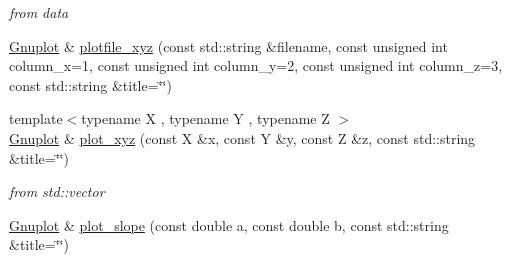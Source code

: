 \begin{DoxyCompactItemize}
\begin{DoxyCompactList}\small\item\em from data \end{DoxyCompactList}\item 
\hyperlink{classkukadu_1_1Gnuplot}{Gnuplot} \& \hyperlink{classkukadu_1_1Gnuplot_a03b4eec7a72bc05abfcdfd7bcd61513b}{plotfile\-\_\-xyz} (const std\-::string \&filename, const unsigned int column\-\_\-x=1, const unsigned int column\-\_\-y=2, const unsigned int column\-\_\-z=3, const std\-::string \&title=\char`\"{}\char`\"{})
\item 
\hypertarget{classkukadu_1_1Gnuplot_ac3e5d63b5a9729d5e609e45abc65520f}{{\footnotesize template$<$typename X , typename Y , typename Z $>$ }\\\hyperlink{classkukadu_1_1Gnuplot}{Gnuplot} \& \hyperlink{classkukadu_1_1Gnuplot_ac3e5d63b5a9729d5e609e45abc65520f}{plot\-\_\-xyz} (const X \&x, const Y \&y, const Z \&z, const std\-::string \&title=\char`\"{}\char`\"{})}\label{classkukadu_1_1Gnuplot_ac3e5d63b5a9729d5e609e45abc65520f}

\begin{DoxyCompactList}\small\item\em from std\-::vector \end{DoxyCompactList}\item 
\hypertarget{classkukadu_1_1Gnuplot_aaddc220bf3a1726a962c801a1218b826}{\hyperlink{classkukadu_1_1Gnuplot}{Gnuplot} \& \hyperlink{classkukadu_1_1Gnuplot_aaddc220bf3a1726a962c801a1218b826}{plot\-\_\-slope} (const double a, const double b, const std\-::string \&title=\char`\"{}\char`\"{})}\label{classkukadu_1_1Gnuplot_aaddc220bf3a1726a962c801a1218b826}


\end{DoxyCompactItemize}
